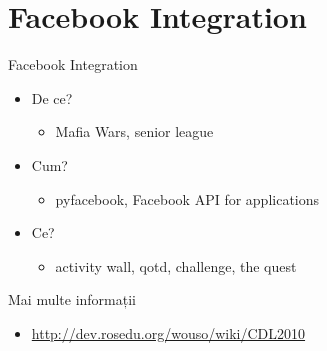 \documentclass{beamer}
\begin{document}
\section{Facebook Integration}

\begin{frame}{Facebook Integration}
  \begin{itemize}
   \item De ce? 
   \pause
   \begin{itemize}
   \item Mafia Wars, senior league
   \end{itemize}
   \pause 
   \item Cum?
   \pause
   \begin{itemize}
   \item pyfacebook, Facebook API for applications
   \end{itemize}
   \pause
   \item Ce?
   \begin{itemize}
   \item activity wall, qotd, challenge, the quest
   \end{itemize}
  \end{itemize}
\end{frame}

\begin{frame}{Mai multe informații}
	\begin{itemize}
	\item \url{http://dev.rosedu.org/wouso/wiki/CDL2010}
	\end{itemize}
\end{frame}
\end{document}
